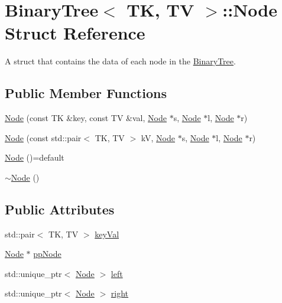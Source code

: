 \hypertarget{structBinaryTree_1_1Node}{}\section{Binary\+Tree$<$ TK, TV $>$\+::Node Struct Reference}
\label{structBinaryTree_1_1Node}


A struct that contains the data of each node in the \mbox{\hyperlink{classBinaryTree}{Binary\+Tree}}.  


\subsection*{Public Member Functions}
\begin{DoxyCompactItemize}
\item 
\mbox{\hyperlink{structBinaryTree_1_1Node_aa1377acea199be263e4bbc0d7fda4eaa}{Node}} (const TK \&key, const TV \&val, \mbox{\hyperlink{structBinaryTree_1_1Node}{Node}} $\ast$s, \mbox{\hyperlink{structBinaryTree_1_1Node}{Node}} $\ast$l, \mbox{\hyperlink{structBinaryTree_1_1Node}{Node}} $\ast$r)
\item 
\mbox{\hyperlink{structBinaryTree_1_1Node_a6137917f379c2ed5b3a78d4d9da6ddf8}{Node}} (const std\+::pair$<$ TK, TV $>$ kV, \mbox{\hyperlink{structBinaryTree_1_1Node}{Node}} $\ast$s, \mbox{\hyperlink{structBinaryTree_1_1Node}{Node}} $\ast$l, \mbox{\hyperlink{structBinaryTree_1_1Node}{Node}} $\ast$r)
\item 
\mbox{\hyperlink{structBinaryTree_1_1Node_ac4125f9e0b3d8a75cc0f1c7bbcc5d838}{Node}} ()=default
\item 
\mbox{\hyperlink{structBinaryTree_1_1Node_a3af4f97d0e37aaaa62fa9b3cc15864fb}{$\sim$\+Node}} ()
\end{DoxyCompactItemize}
\subsection*{Public Attributes}
\begin{DoxyCompactItemize}
\item 
std\+::pair$<$ TK, TV $>$ \mbox{\hyperlink{structBinaryTree_1_1Node_a072d4d35344db07dc1bdec47d78e3a63}{key\+Val}}
\item 
\mbox{\hyperlink{structBinaryTree_1_1Node}{Node}} $\ast$ \mbox{\hyperlink{structBinaryTree_1_1Node_a855b9a95346f66f45013ca406813a4d3}{pp\+Node}}
\item 
std\+::unique\+\_\+ptr$<$ \mbox{\hyperlink{structBinaryTree_1_1Node}{Node}} $>$ \mbox{\hyperlink{structBinaryTree_1_1Node_a4287689cdd537564e846184c76f084f7}{left}}
\item 
std\+::unique\+\_\+ptr$<$ \mbox{\hyperlink{structBinaryTree_1_1Node}{Node}} $>$ \mbox{\hyperlink{structBinaryTree_1_1Node_a098842d35cfa60029b10a7c4306f2ea6}{right}}
\end{DoxyCompactItemize}


